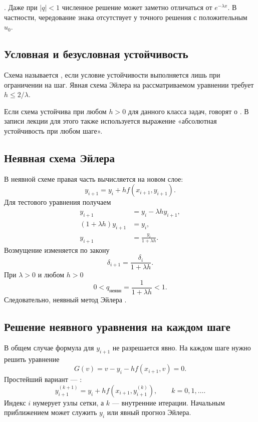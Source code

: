 \documentclass[../final.tex]{subfiles}
\begin{document}
\remark
{}. Даже при $|q|<1$
численное решение может заметно отличаться от $e^{-\lambda x}$.
В частности, чередование знака отсутствует у точного решения
с положительным $u_0$.

\subsection{Условная и безусловная устойчивость}

Схема называется , если условие
устойчивости выполняется лишь при ограничении на шаг. Явная схема
Эйлера на рассматриваемом уравнении требует $h\le2/\lambda$.

Если схема устойчива при любом $h>0$ для данного класса задач,
говорят о . В записи лекции
для этого также используется выражение «абсолютная устойчивость
при любом шаге».

\subsection{Неявная схема Эйлера}

В неявной схеме правая часть вычисляется на новом слое:
\begin{equation*}
    y_{i+1}=y_i+h f(x_{i+1},y_{i+1}).
\end{equation*}
Для тестового уравнения получаем
\begin{align*}
    y_{i+1}&=y_i-\lambda h y_{i+1},\\
    (1+\lambda h)y_{i+1}&=y_i,\\
    y_{i+1}&=\frac{y_i}{1+\lambda h}.
\end{align*}
Возмущение изменяется по закону
\begin{equation*}
    \delta_{i+1}=\frac{\delta_i}{1+\lambda h}.
\end{equation*}
При $\lambda>0$ и любом $h>0$
\begin{equation*}
    0<q_{\text{неявн}}=\frac1{1+\lambda h}<1.
\end{equation*}
Следовательно, неявный метод Эйлера
.

\subsection{Решение неявного уравнения на каждом шаге}

В общем случае формула для $y_{i+1}$ не разрешается явно.
На каждом шаге нужно решить уравнение
\begin{equation*}
    G(v)=v-y_i-h f(x_{i+1},v)=0.
\end{equation*}
Простейший вариант --- :
\begin{equation*}
    y_{i+1}^{(k+1)}=y_i+h f(x_{i+1},y_{i+1}^{(k)}),
    \qquad k=0,1,\ldots.
\end{equation*}
Индекс $i$ нумерует узлы сетки, а $k$ --- внутренние итерации.
Начальным приближением может служить $y_i$ или явный прогноз Эйлера.
\end{document}
